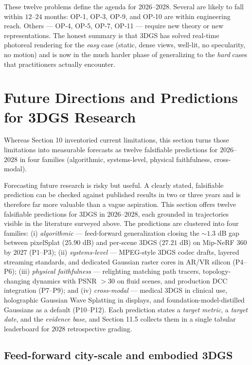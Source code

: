 These twelve problems define the agenda for 2026--2028. Several are likely to fall within \(12\)--\(24\) months: OP-1, OP-3, OP-9, and OP-10 are within engineering reach. Others --- OP-4, OP-5, OP-7, OP-11 --- require new theory or new representations. The honest summary is that 3DGS has solved real-time photoreal rendering for the \emph{easy} case (static, dense views, well-lit, no specularity, no motion) and is now in the much harder phase of generalizing to the \emph{hard} cases that practitioners actually encounter.

\section{Future Directions and Predictions for 3DGS Research}\label{future-directions-and-predictions-for-3dgs-research}

Whereas Section 10 inventoried current limitations, this section turns those limitations into measurable forecasts as twelve falsifiable predictions for \(2026\)--\(2028\) in four families (algorithmic, systems-level, physical faithfulness, cross-modal).

Forecasting future research is risky but useful. A clearly stated, falsifiable prediction can be checked against published results in two or three years and is therefore far more valuable than a vague aspiration. This section offers twelve falsifiable predictions for 3DGS in \(2026\)--\(2028\), each grounded in trajectories visible in the literature surveyed above. The predictions are clustered into four families: (i) \emph{algorithmic} --- feed-forward generalization closing the \(\sim\!1.3\) dB gap between pixelSplat (\(25.90\) dB) and per-scene 3DGS (\(27.21\) dB) on Mip-NeRF 360 by \(2027\) (P1--P3); (ii) \emph{systems-level} --- MPEG-style 3DGS codec drafts, layered streaming standards, and dedicated Gaussian raster cores in AR/VR silicon (P4--P6); (iii) \emph{physical faithfulness} --- relighting matching path tracers, topology-changing dynamics with PSNR \(>30\) on fluid scenes, and production DCC integration (P7--P9); and (iv) \emph{cross-modal} --- medical 3DGS in clinical use, holographic Gaussian Wave Splatting in displays, and foundation-model-distilled Gaussians as a default (P10--P12). Each prediction states a \emph{target metric}, a \emph{target date}, and the \emph{evidence base}, and Section 11.5 collects them in a single tabular leaderboard for \(2028\) retrospective grading.

\subsection{Feed-forward city-scale and embodied 3DGS}\label{feed-forward-city-scale-and-embodied-3dgs}

